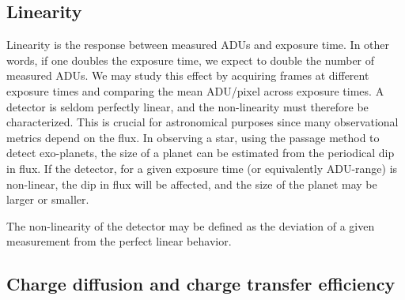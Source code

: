 \documentclass[../main.tex]{subfiles}
\begin{document}
	\subsection{Linearity}
	Linearity is the response between measured ADUs and exposure time. In other words, if one doubles the exposure time, we expect to double the number of measured ADUs. We may study this effect by acquiring frames at different exposure times and comparing the mean ADU/pixel across exposure times. A detector is seldom perfectly linear, and the non-linearity must therefore be characterized. This is crucial for astronomical purposes since many observational metrics depend on the flux. In observing a star, using the passage method to detect exo-planets, the size of a planet can be estimated from the periodical dip in flux. If the detector, for a given exposure time (or equivalently ADU-range) is non-linear, the dip in flux will be affected, and the size of the planet may be larger or smaller. 
	
	The non-linearity of the detector may be defined as the deviation of a given measurement from the perfect linear behavior.
	
	\subsection{Charge diffusion and charge transfer efficiency}
	
	
\end{document}
